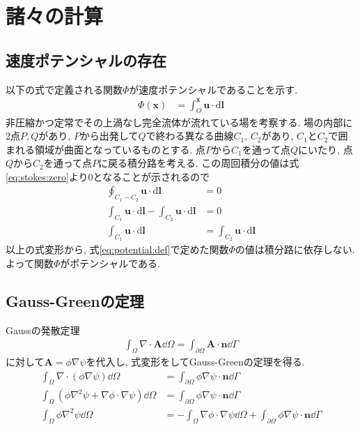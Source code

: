 \documentclass{ltjsarticle}
\begin{document}
\clearpage
\printbibliography[title=参考文献]

\appendix
\section{諸々の計算}
\subsection{速度ポテンシャルの存在}
\label{appendix:potential}
以下の式で定義される関数$\Phi$が速度ポテンシャルであることを示す.
\begin{align}
    \Phi(\bm{x}) &= \int_O^{\bm{x}} \bm{u}\cdot\mathrm{d}\bm{l} \label{eq:potential:def}
\end{align}
非圧縮かつ定常でその上渦なし完全流体が流れている場を考察する.
場の内部に2点$P,Q$があり, $P$から出発して$Q$で終わる異なる曲線$C_1$, $C_2$があり,
$C_1$と$C_2$で囲まれる領域が曲面となっているものとする.
点$P$から$C_1$を通って点$Q$にいたり, 点$Q$から$C_2$を通って点$P$に戻る積分路を考える.
この周回積分の値は式\eqref{eq:stokes:zero}より0となることが示されるので
\begin{align}
    \oint_{C_1-C_2}\bm{u}\cdot\mathrm{d}\bm{l} &= 0 \\
    \int_{C_1}\bm{u}\cdot\mathrm{d}\bm{l}-\int_{C_2}\bm{u}\cdot\mathrm{d}\bm{l} &=0\\
    \int_{C_1}\bm{u}\cdot\mathrm{d}\bm{l}&=\int_{C_2}\bm{u}\cdot\mathrm{d}\bm{l}
\end{align}
以上の式変形から, 式\eqref{eq:potential:def}で定めた関数$\Phi$の値は積分路に依存しない.
よって関数$\Phi$がポテンシャルである.

\subsection{Gauss-Greenの定理}
\label{appendix:gauss_green}
Gaussの発散定理
\begin{align}
    \int_\Omega\nabla\cdot\bm{A}\dd{\Omega} =\int_{\partial\Omega}\bm{A}\cdot\bm{n}\dd{\Gamma}
    \label{eq:divergence_theorem}
\end{align}
に対して$\bm{A}=\phi\nabla\psi$を代入し, 式変形をしてGauss-Greenの定理を得る.
\begin{align}
    \int_\Omega\nabla\cdot(\phi\nabla\psi)\dd{\Omega} 
    &=\int_{\partial\Omega}\phi\nabla\psi\cdot\bm{n}\dd{\Gamma} \\
    \int_\Omega(\phi\nabla^2\psi+\nabla\phi\cdot\nabla\psi)\dd{\Omega} 
    &=\int_{\partial\Omega}\phi\nabla\psi\cdot\bm{n}\dd{\Gamma} \\
    \int_\Omega\phi\nabla^2\psi\dd{\Omega} 
    &=- \int_\Omega\nabla\phi\cdot\nabla\psi\dd{\Omega}
    +\int_{\partial\Omega}\phi\nabla\psi\cdot\bm{n}\dd{\Gamma}
\end{align}
\end{document}
